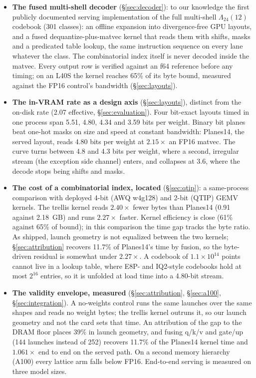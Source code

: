 \begin{itemize}
\item[\textbf{C1}] \textbf{The fused multi-shell decoder}
(\S\ref{sec:decoder}): to our knowledge the first publicly documented
serving implementation
of the full multi-shell $\Lambda_{24}(12)$ codebook (301 classes): an
offline expansion into divergence-free GPU layouts, and a fused
dequantize-plus-matvec kernel that reads them with shifts, masks and a
predicated table lookup, the same instruction sequence on every lane
whatever the class. The combinatorial index itself is never decoded inside
the matvec. Every output row is verified against an f64 reference before
any timing; on an L40S the kernel reaches 65\% of its byte bound, measured
against the FP16 control's bandwidth (\S\ref{sec:layouts}).

\item[\textbf{C2}] \textbf{The in-VRAM rate as a design axis}
(\S\ref{sec:layouts}), distinct from the on-disk rate (2.07 effective,
\S\ref{sec:evaluation}). Four bit-exact layouts timed in one process span
5.51, 4.80, 4.34 and 3.59 bits per weight. Binary bit planes beat one-hot
masks on size and speed at constant bandwidth: Planes14, the served layout,
reads 4.80 bits per weight at $2.15\times$ an FP16 matvec. The curve turns
between 4.8 and 4.3 bits per weight, where a second, irregular stream (the
exception side channel) enters, and collapses at 3.6, where the decode stops
being shifts and masks.

\item[\textbf{C3}] \textbf{The cost of a combinatorial index, located}
(\S\ref{sec:qtip}): a same-process comparison with deployed 4-bit
(AWQ w4g128) and 2-bit (QTIP) GEMV kernels. The trellis kernel reads
$2.40\times$ fewer bytes than Planes14 (0.91 against 2.18~GB) and runs
$2.27\times$ faster. Kernel efficiency is close (61\% against 65\% of
bound); in this comparison the time gap tracks the byte ratio. As shipped, launch geometry is not
equalized between the two kernels; \S\ref{sec:attribution} recovers 11.7\%
of Planes14's time by fusion, so the byte-driven residual is somewhat under
$2.27\times$. A codebook of $1.1\times10^{14}$ points
cannot live in a lookup table, where E8P- and IQ2-style codebooks hold at
most $2^{16}$ entries, so it is unfolded at load time into a 4.80-bit
stream.

\item[\textbf{C4}] \textbf{The validity envelope, measured}
(\S\ref{sec:attribution}, \S\ref{sec:a100}, \S\ref{sec:integration}). A
no-weights control runs the same launches over the same shapes and reads no
weight bytes; the trellis kernel outruns it, so our launch geometry and not
the card sets that time. An attribution of the gap to the DRAM floor places
39\% in launch geometry, and fusing q/k/v and gate/up (144 launches instead
of 252) recovers 11.7\% of the Planes14 kernel time and $1.061\times$ end to
end on the served path. On a second memory hierarchy (A100) every lattice arm
falls below FP16. End-to-end serving is measured on three model sizes.
\end{itemize}

